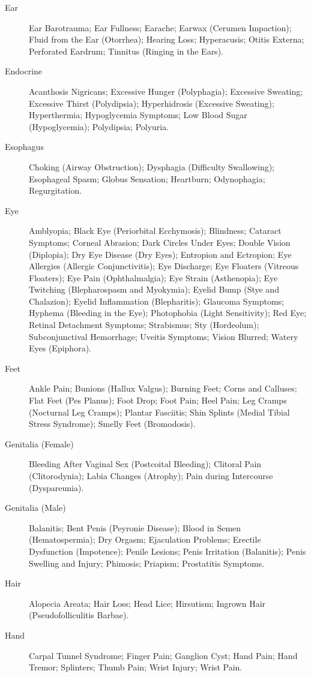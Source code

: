 \begin{description}
  \item[Ear] Ear Barotrauma; Ear Fullness; Earache; Earwax (Cerumen Impaction); Fluid from the Ear (Otorrhea); Hearing Loss; Hyperacusis; Otitis Externa; Perforated Eardrum; Tinnitus (Ringing in the Ears).
  \item[Endocrine] Acanthosis Nigricans; Excessive Hunger (Polyphagia); Excessive Sweating; Excessive Thirst (Polydipsia); Hyperhidrosis (Excessive Sweating); Hyperthermia; Hypoglycemia Symptoms; Low Blood Sugar (Hypoglycemia); Polydipsia; Polyuria.
  \item[Esophagus] Choking (Airway Obstruction); Dysphagia (Difficulty Swallowing); Esophageal Spasm; Globus Sensation; Heartburn; Odynophagia; Regurgitation.
  \item[Eye] Amblyopia; Black Eye (Periorbital Ecchymosis); Blindness; Cataract Symptoms; Corneal Abrasion; Dark Circles Under Eyes; Double Vision (Diplopia); Dry Eye Disease (Dry Eyes); Entropion and Ectropion; Eye Allergies (Allergic Conjunctivitis); Eye Discharge; Eye Floaters (Vitreous Floaters); Eye Pain (Ophthalmalgia); Eye Strain (Asthenopia); Eye Twitching (Blepharospasm and Myokymia); Eyelid Bump (Stye and Chalazion); Eyelid Inflammation (Blepharitis); Glaucoma Symptoms; Hyphema (Bleeding in the Eye); Photophobia (Light Sensitivity); Red Eye; Retinal Detachment Symptoms; Strabismus; Sty (Hordeolum); Subconjunctival Hemorrhage; Uveitis Symptoms; Vision Blurred; Watery Eyes (Epiphora).
  \item[Feet] Ankle Pain; Bunions (Hallux Valgus); Burning Feet; Corns and Calluses; Flat Feet (Pes Planus); Foot Drop; Foot Pain; Heel Pain; Leg Cramps (Nocturnal Leg Cramps); Plantar Fasciitis; Shin Splints (Medial Tibial Stress Syndrome); Smelly Feet (Bromodosis).
  \item[Genitalia (Female)] Bleeding After Vaginal Sex (Postcoital Bleeding); Clitoral Pain (Clitorodynia); Labia Changes (Atrophy); Pain during Intercourse (Dyspareunia).
  \item[Genitalia (Male)] Balanitis; Bent Penis (Peyronie Disease); Blood in Semen (Hematospermia); Dry Orgasm; Ejaculation Problems; Erectile Dysfunction (Impotence); Penile Lesions; Penis Irritation (Balanitis); Penis Swelling and Injury; Phimosis; Priapism; Prostatitis Symptoms.
  \item[Hair] Alopecia Areata; Hair Loss; Head Lice; Hirsutism; Ingrown Hair (Pseudofolliculitis Barbae).
  \item[Hand] Carpal Tunnel Syndrome; Finger Pain; Ganglion Cyst; Hand Pain; Hand Tremor; Splinters; Thumb Pain; Wrist Injury; Wrist Pain.

\end{description}

